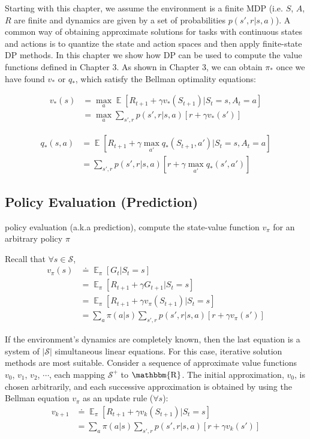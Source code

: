 \documentclass[lang=en,mode=geye,device=normal,color=blue,14pt]{elegantnote}
\DeclareMathOperator*{\E}{\mathbb{E}}
\DeclareMathOperator*{\1}{\mathbbm{1}}
\DeclareMathOperator*{\R}{\mathbbm{R}}
\begin{document}
Starting with this chapter, we assume the environment is a finite MDP (i.e. $S$, $A$, $R$ are finite and dynamics are given by a set of probabilities $p(s',r|s,a)$).
A common way of obtaining approximate solutions for tasks with continuous states and actions is to quantize the state and action spaces and then apply finite-state DP methods.
In this chapter we show how DP can be used to compute the value functions defined in Chapter 3. As shown in Chapter 3, we can obtain $\pi_*$ once we have found $v_*$ or $q_*$, which satisfy the Bellman optimality equations:

\begin{align*}
v_*(s) & = \max_a \E [R_{t+1} + \gamma v_*(S_{t+1}) | S_t = s, A_t = a] \\
& = \max_a \sum_{s',r} p(s',r|s,a)[r + \gamma v_*(s')]
\end{align*}

\begin{align*}
q_*(s,a) & = \E [R_{t+1} + \gamma \max_{a'} q_*(S_{t+1},a') | S_t = s, A_t = a] \\
& = \sum_{s',r} p(s',r|s,a)[r+\gamma \max_{a'} q_*(s',a')]
\end{align*}

\subsection{Policy Evaluation (Prediction)}
\begin{definition}
policy evaluation (a.k.a prediction), compute the state-value function $v_\pi$ for an arbitrary policy $\pi$
\end{definition}

Recall that $\forall s \in \mathcal{S}$,
\begin{align*}
v_\pi(s) & \doteq \E_\pi [G_t | S_t = s] \\
& = \E_\pi [R_{t+1} + \gamma G_{t+1} | S_t = s] \\
& = \E_\pi [R_{t+1} + \gamma v_\pi (S_{t+1}) | S_t = s] \\
& = \sum_a \pi (a|s) \sum_{s',r} p(s',r|s,a) [r+\gamma v_\pi (s')]
\end{align*}

If the environment's dynamics are completely known, then the last equation is a system of $|\mathcal{S}|$ simultaneous linear equations.
For this case, iterative solution methods are most suitable. Consider a sequence of approximate value functions $v_0$, $v_1$, $v_2$, $\cdots$, each mapping $\mathcal{S^+}$ to $\R$.
The initial approximation, $v_0$, is chosen arbitrarily, and each successive approximation is obtained by using the Bellman equation $v_\pi$ as an update rule ($\forall s$):
\begin{align*}
v_{k+1} & \doteq \E_\pi [R_{t+1} + \gamma v_k (S_{t+1}) | S_t = s] \\
& = \sum_a \pi (a|s) \sum_{s',r} p(s',r|s,a)[r+\gamma v_k (s')]
\end{align*}
\end{document}
